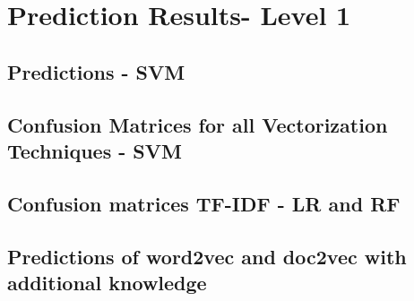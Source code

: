 \documentclass[12pt, a4paper, titlepage]{article}
\begin{document}
  \newpage

\section{Prediction Results- Level 1}
\label{sec:B}
\subsection*{Predictions - SVM}
\subsection*{Confusion Matrices for all Vectorization Techniques - SVM}
\subsection*{Confusion matrices TF-IDF - LR and RF}
\subsection*{Predictions of word2vec and doc2vec with additional knowledge}
\end{document}
